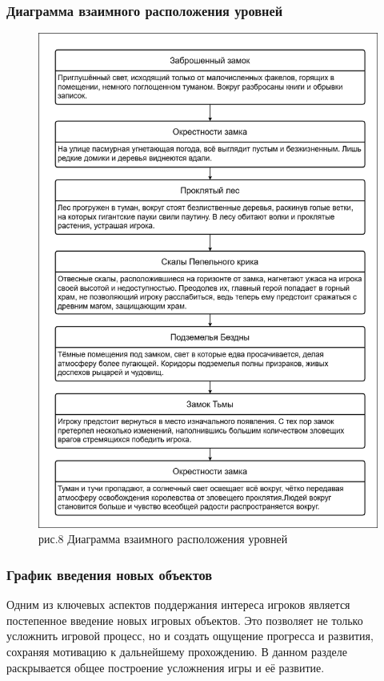 \documentclass{article}
\begin{document}
\subsubsection{Диаграмма взаимного расположения уровней}
\begin{figure}[h]
    \centering
    \includegraphics[width=283px\linewidth]{Взаимное расположение уровней(рис.8).png} \\ рис.8 Диаграмма взаимного расположения уровней
    \label{fig:artifact}
\end{figure}

\subsubsection{График введения новых объектов}

Одним из ключевых аспектов поддержания интереса игроков является постепенное введение новых игровых объектов. Это позволяет не только усложнить игровой процесс, но и создать ощущение прогресса и развития, сохраняя мотивацию к дальнейшему прохождению. В данном разделе раскрывается общее построение усложнения игры и её развитие.
\end{document}
